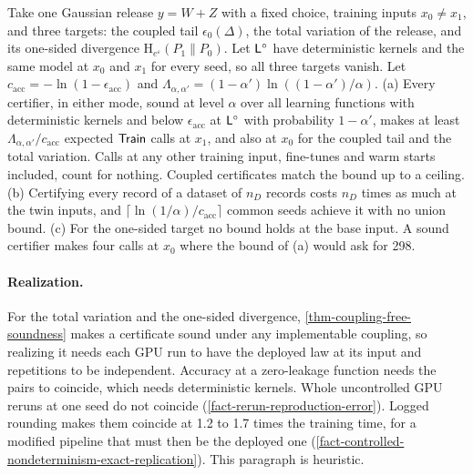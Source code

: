 \begin{theorem}
Take one Gaussian release $y=W+Z$ with a fixed choice, training inputs $x_0\neq x_1$,
and three targets: the coupled tail $\epsilon_0(\Delta)$, the total variation of the
release, and its one-sided divergence $\mathrm H_{e^\varepsilon}(P_1\|P_0)$. Let $\mathsf{L}^\circ$ have
deterministic kernels and the same model at $x_0$ and $x_1$ for every seed, so all
three targets vanish. Let $c_{\mathrm{acc}}=-\ln(1-\epsilon_{\mathrm{acc}})$ and
$\Lambda_{\alpha,\alpha'}=(1-\alpha')\ln((1-\alpha')/\alpha)$. (a) Every certifier, in either
mode, sound at level $\alpha$ over all learning functions with deterministic kernels
and below $\epsilon_{\mathrm{acc}}$ at $\mathsf{L}^\circ$ with probability $1-\alpha'$, makes at least
$\Lambda_{\alpha,\alpha'}/c_{\mathrm{acc}}$ expected $\mathsf{Train}$ calls at $x_1$, and also at $x_0$
for the coupled tail and the total variation. Calls at any other training input,
fine-tunes and warm starts included, count for nothing. Coupled certificates match
the bound up to a ceiling. (b) Certifying every record of a dataset of $n_D$ records
costs $n_D$ times as much at the twin inputs, and $\lceil\ln(1/\alpha)/c_{\mathrm{acc}}\rceil$
common seeds achieve it with no union bound. (c) For the one-sided target no bound
holds at the base input. A sound certifier makes four calls at $x_0$ where the bound
of (a) would ask for 298.
\end{theorem}

\paragraph{Realization.} For the total variation and the one-sided divergence,
\cref{thm-coupling-free-soundness} makes a certificate sound under any implementable
coupling, so realizing it needs each GPU run to have the deployed law at its input
and repetitions to be independent. Accuracy at a zero-leakage function needs the
pairs to coincide, which needs deterministic kernels. Whole uncontrolled GPU reruns
at one seed do not coincide (\cref{fact-rerun-reproduction-error}). Logged rounding makes
them coincide at 1.2 to 1.7 times the training time, for a modified pipeline that
must then be the deployed one (\cref{fact-controlled-nondeterminism-exact-replication}).
This paragraph is heuristic.
